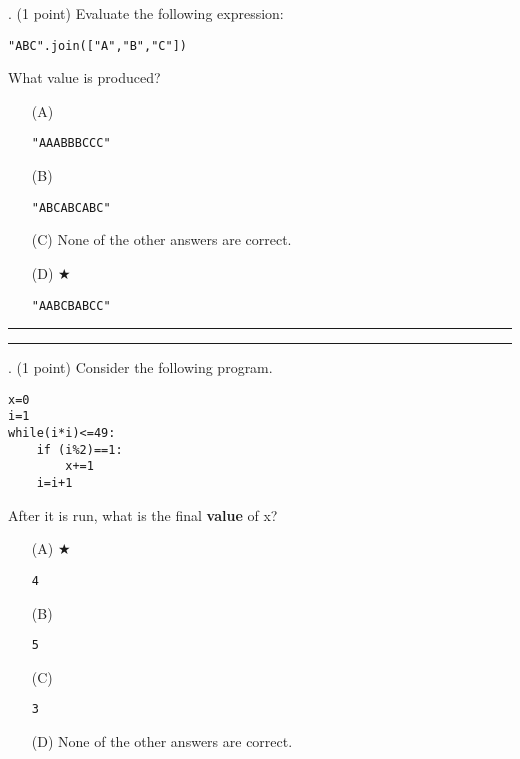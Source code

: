 \documentclass{article}
\begin{document}
\newpage






\newpage
{}. (1 point)
Evaluate the following expression:
\begin{verbatim}
"ABC".join(["A","B","C"])
\end{verbatim}
What value is produced?


\begin{enumerate}
\item[(A)]
\begin{verbatim}"AAABBBCCC"\end{verbatim}

\item[(B)]
\begin{verbatim}"ABCABCABC"\end{verbatim}

\item[(C)]
None of the other answers are correct.

\item[(D)] $\bigstar$ 
\begin{verbatim}"AABCBABCC"\end{verbatim}

\end{enumerate}

\vspace*{2em}
\hrule
\vspace{2em}

\vspace{2em}
\hrule height 2pt


\newpage
{}. (1 point)
Consider the following program.
\begin{verbatim}
x=0
i=1
while(i*i)<=49:
    if (i%2)==1:
        x+=1
    i=i+1
\end{verbatim}
After it is run, what is the final \textbf{value} of x?


\begin{enumerate}
\item[(A)] $\bigstar$ 
\begin{verbatim}4\end{verbatim}

\item[(B)]
\begin{verbatim}5\end{verbatim}

\item[(C)]
\begin{verbatim}3\end{verbatim}

\item[(D)]
None of the other answers are correct.

\end{enumerate}
\end{document}
